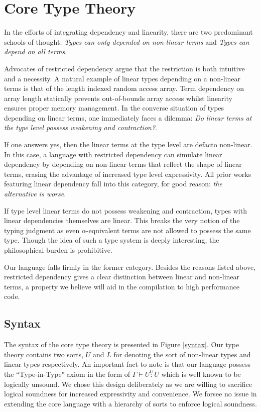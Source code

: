 \documentclass{article}
\newcommand{\utype}{\overset{U}{:}}
\begin{document}
  \section{Core Type Theory}
  In the efforts of integrating dependency and linearity, there are two predominant schools of thought: \textit{Types can only depended on non-linear terms} and \textit{Types can depend on all terms}. 
  
  Advocates of restricted dependency argue that the restriction is both intuitive and a necessity. A natural example of linear types depending on a non-linear terms is that of the length indexed random access array. Term dependency on array length statically prevents out-of-bounds array access whilst linearity ensures proper memory management. In the converse situation of types depending on linear terms, one immediately faces a dilemma: \textit{Do linear terms at the type level possess weakening and contraction?}.
  
  If one answers yes, then the linear terms at the type level are defacto non-linear. In this case, a language with restricted dependency can simulate linear dependency by depending on non-linear terms that reflect the shape of linear terms\cite{ldqt}, erasing the advantage of increased type level expressivity. All prior works featuring linear dependency fall into this category, for good reason: \textit{the alternative is worse}.
  
  If type level linear terms do not possess weakening and contraction, types with linear dependencies themselves are linear. This breaks the very notion of the typing judgment as even $\alpha$-equivalent terms are not allowed to possess the same type. Though the idea of such a type system is deeply interesting, the philosophical burden is prohibitive.
  
  Our language falls firmly in the former category. Besides the reasons listed above, restricted dependency gives a clear distinction between linear and non-linear terms, a property we believe will aid in the compilation to high performance code.
  
  \subsection{Syntax}
  The syntax of the core type theory is presented in Figure \ref{syntax}. Our type theory contains two sorts, $U$ and $L$ for denoting the sort of non-linear types and linear types respectively. An important fact to note is that our language possess the ``Type-in-Type" axiom in the form of $\Gamma \vdash U \utype U$ which is well known to be logically unsound. We chose this design deliberately as we are willing to sacrifice logical soundness for increased expressivity and convenience. We forsee no issue in extending the core language with a hierarchy of sorts to enforce logical soundness.
\end{document}
